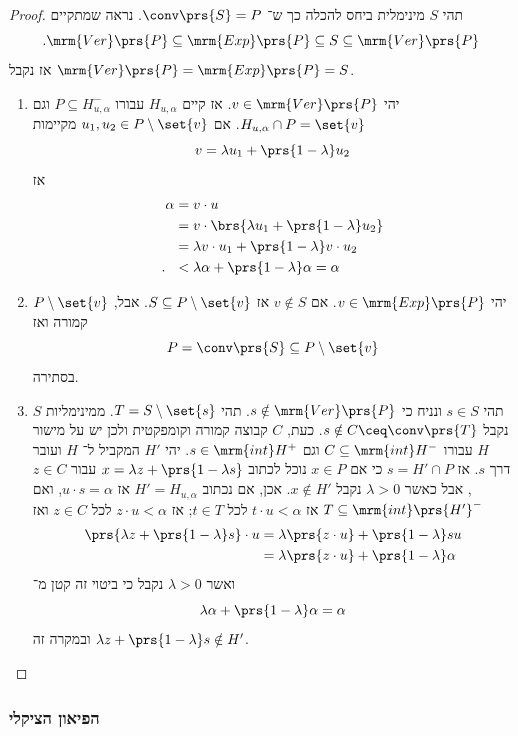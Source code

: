 \documentclass[a4paper,10pt,twoside,openany]{book}
\begin{document}
\begin{proof}
תהי
$S$
מינימלית ביחס להכלה כך ש־%
$\conv\prs{S} = P$.
נראה שמתקיים
\[\text{.} \mrm{Ver}\prs{P} \subseteq \mrm{Exp}\prs{P} \subseteq S \subseteq \mrm{Ver}\prs{P}\]
אז נקבל
$\mrm{Ver}\prs{P} = \mrm{Exp}\prs{P} = S$.

\begin{enumerate}
\item יהי
$v \in \mrm{Ver}\prs{P}$.
אז קיים
$H_{u,\alpha}$
עבורו
$P \subseteq H_{u,\alpha}^-$
וגם
$H_{u,\alpha} \cap P = \set{v}$.
אם
$u_1, u_2 \in P \setminus \set{v}$
מקיימות
\[v = \lambda u_1 + \prs{1-\lambda} u_2\]
אז
\begin{align*}
\alpha &= v \cdot u
\\&= v \cdot \brs{\lambda u_1 + \prs{1-\lambda} u_2}
\\&= \lambda v \cdot u_1 + \prs{1-\lambda} v \cdot u_2
\\ \text{.} \hphantom{\alpha} &< \lambda \alpha + \prs{1-\lambda} \alpha = \alpha
\end{align*}
\item
יהי
$v \in \mrm{Exp}\prs{P}$.
אם
$v \notin S$
אז
$S \subseteq P \setminus \set{v}$.
אבל,
$P \setminus \set{v}$
קמורה ואז
\[P = \conv\prs{S} \subseteq P \setminus \set{v}\]
בסתירה.
\item תהי
$s \in S$
ונניח כי
$s \notin \mrm{Ver}\prs{P}$.
תהי
$T = S \setminus \set{s}$.
ממינימליות
$S$
נקבל
$s \notin C \ceq \conv\prs{T}$.
כעת,
$C$
קבוצה קמורה וקומפקטית ולכן יש על מישור
$H$
עבורו
$C \subseteq \mrm{int}H^-$
וגם
$s \in \mrm{int}H^+$.
יהי
$H'$
המקביל ל־%
$H$
ועובר דרך
$s$.
אז
$s = H' \cap P$
כי אם
$x \in P$
נוכל לכתוב
$x = \lambda z + \prs{1-\lambda s}$
עבור
$z \in C$,
אבל כאשר
$\lambda > 0$
נקבל
$x \notin H'$.
אכן, אם נכתוב
$H' = H_{u,\alpha}$
אז
$u \cdot s = \alpha$,
ואם
$T \subseteq \mrm{int}\prs{H'}^-$
אז
$t \cdot u < \alpha$
לכל
$t \in T$;
אז
$z \cdot u < \alpha$
לכל
$z \in C$
ואז
\begin{align*}
\prs{\lambda z + \prs{1-\lambda} s} \cdot u &= \lambda \prs{z \cdot u} + \prs{1-\lambda} s u
\\&= \lambda \prs{z \cdot u} + \prs{1-\lambda}\alpha
\end{align*}
ואשר
$\lambda > 0$
נקבל כי ביטוי זה קטן מ־%
\[\lambda \alpha + \prs{1-\lambda}\alpha = \alpha\]
ובמקרה זה
$\lambda z + \prs{1-\lambda} s \notin H'$.
\end{enumerate}
\end{proof}

\subsubsection{הפיאון הציקלי}
\end{document}
